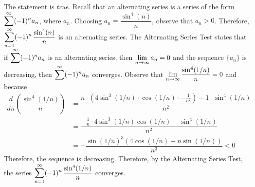 \documentclass[11pt,letterpaper]{article}
\begin{document}
\sol The statement is \textit{true}. Recall that an alternating series is a series of the form $\displaystyle\sum^\infty (-1)^n a_n$, where $a_n$. Choosing $a_n= \dfrac{\sin^4(n)}{n}$, observe that $a_n > 0$. Therefore, $\displaystyle\sum_{n=1}^\infty (-1)^n\, \dfrac{\sin^4(n)}{n}$ is an alternating series. The Alternating Series Test states that if $\displaystyle\sum^\infty (-1)^n a_n$ is an alternating series, then $\displaystyle\lim_{n \to \infty} a_n= 0$ and the sequence $\{ a_n \}$ is decreasing, then $\displaystyle\sum^\infty (-1)^n a_n$ converges. Observe that $\displaystyle\lim_{n \to \infty} \dfrac{\sin^4(1/n)}{n}= 0$ and because 
	\[
	\begin{aligned}
	\dfrac{d}{dn} \left( \dfrac{\sin^4(1/n)}{n} \right)&= \dfrac{n \cdot (4 \sin^3(1/n) \cdot \cos(1/n) \cdot -\frac{1}{n^2}) - 1 \cdot \sin^4(1/n)}{n^2} \\
	&= \dfrac{-\frac{1}{n} \cdot 4 \sin^3(1/n) \cos(1/n) - \sin^4(1/n)}{n^2} \\
	&= -\dfrac{\sin(1/n)^3 \left(4 \cos(1/n) + n \sin(1/n) \right)}{n^3} < 0
	\end{aligned}
	\]
Therefore, the sequence is decreasing. Therefore, by the Alternating Series Test, the series $\displaystyle\sum_{n=1}^\infty (-1)^n\, \dfrac{\sin^4(1/n)}{n}$ converges. \pvspace{1.3cm}
\end{document}
